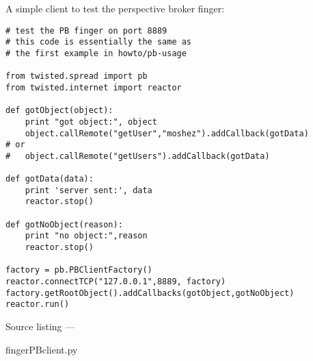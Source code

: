 A simple client to test the perspective broker finger:\begin{verbatim}
# test the PB finger on port 8889
# this code is essentially the same as
# the first example in howto/pb-usage

from twisted.spread import pb
from twisted.internet import reactor

def gotObject(object):
    print "got object:", object
    object.callRemote("getUser","moshez").addCallback(gotData)
# or
#   object.callRemote("getUsers").addCallback(gotData)

def gotData(data):
    print 'server sent:', data
    reactor.stop()

def gotNoObject(reason):
    print "no object:",reason
    reactor.stop()

factory = pb.PBClientFactory()
reactor.connectTCP("127.0.0.1",8889, factory)
factory.getRootObject().addCallbacks(gotObject,gotNoObject)
reactor.run()
\end{verbatim}\parbox[b]{\linewidth}{\begin{center}Source listing --- \begin{em}fingerPBclient.py\end{em}\end{center}}